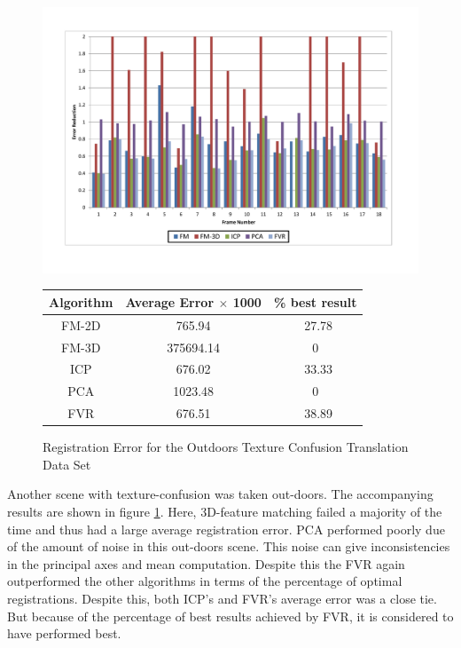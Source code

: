 \begin{figure}
\centering
\includegraphics[width=6in]{images/results/Outside_TextureConfusion_Translation}
\caption{Registration Error for the Outdoors Texture Confusion Translation Data Set}
\label{fig:PET16}

\begin{tabular}{ccc}
\hline
\textbf{Algorithm} & \textbf{Average Error $\times$ 1000} & \textbf{\% best result}\\ \hline
FM-2D	& 765.94 & ~27.78\\
FM-3D	& 375694.14 & 0\\
ICP		& 676.02 & ~33.33\\
PCA		& 1023.48 & 0\\
FVR		& 676.51 & ~38.89\\
\end{tabular}
\end{figure}

Another scene with texture-confusion was taken out-doors. The accompanying results are shown in figure \ref{fig:PET16}. Here, 3D-feature matching failed a majority of the time and thus had a large average registration error. PCA performed poorly due of the amount of noise in this out-doors scene. This noise can give inconsistencies in the principal axes and mean computation. Despite this the FVR again outperformed the other algorithms in terms of the percentage of optimal registrations. Despite this, both ICP's and FVR's average error was a close tie. But because of the percentage of best results achieved by FVR, it is considered to have performed best. \\

